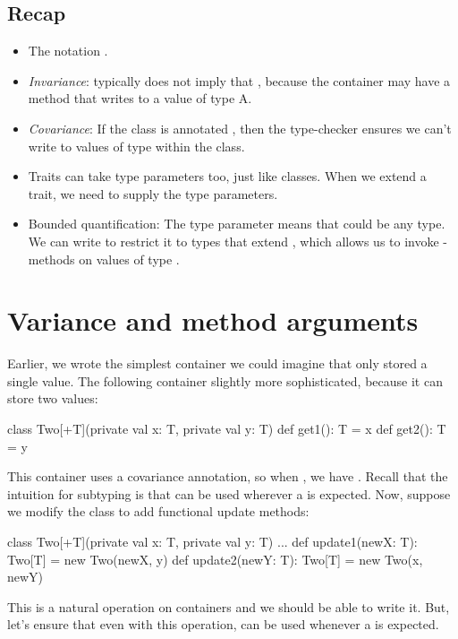 \documentclass{book}
\begin{document}
\newlecture

\begin{instructor}

\section{Recap}

\begin{itemize}
	\item The notation .
	\item \emph{Invariance}: typically  does not imply that , because the container may have a method that writes to a value of type A.
	\item \emph{Covariance}: If the class is annotated , then the type-checker ensures we can't write to values of type  within the class.
	\item Traits can take type parameters too, just like classes. When we extend a trait, we need to supply the type parameters.
	\item Bounded quantification: The type parameter means that  could be any type. We can write  to restrict it to types that extend , which allows us to invoke -methods on values of type .
\end{itemize}
\end{instructor}

\section{Variance and method arguments}

Earlier, we wrote the simplest container we could imagine that only stored
a single value. The following container slightly more sophisticated, because
it can store two values:
\begin{scalacode}
class Two[+T](private val x: T, private val y: T) {
  def get1(): T = x
  def get2(): T = y
}
\end{scalacode}
This container uses a covariance annotation, so when ,
we have . Recall that the
intuition for subtyping is that  can be used
wherever a  is expected. Now, suppose we modify the class to
add functional update methods:
\begin{scalacode}
class Two[+T](private val x: T, private val y: T) {
  ...
  def update1(newX: T): Two[T] = new Two(newX, y)
  def update2(newY: T): Two[T] = new Two(x, newY)
}
\end{scalacode}
This is a natural operation on containers and we should be able to write it.
But, let's ensure that even with this operation,  can
be used whenever a  is expected.
\end{document}
